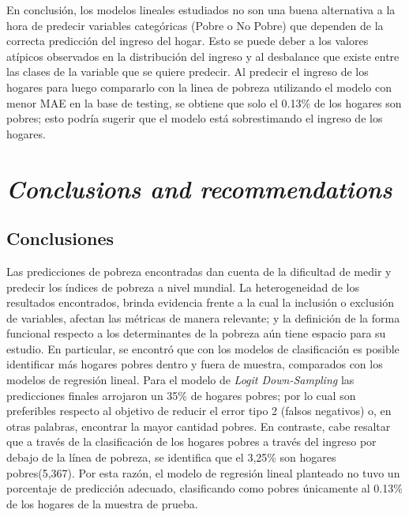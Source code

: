 \documentclass[11pt]{article}
\begin{document}
\justify
En conclusión, los modelos lineales estudiados no son una buena alternativa a la hora de predecir variables categóricas (Pobre o No Pobre) que dependen de la correcta predicción del ingreso del hogar. Esto se puede deber a los valores atípicos observados en la distribución del ingreso y al desbalance que existe entre las clases de la variable que se quiere predecir. Al predecir el ingreso de los hogares para luego compararlo con la linea de pobreza utilizando el modelo con menor MAE en la base de testing, se obtiene que solo el 0.13\% de los hogares son pobres; esto podría sugerir que el modelo está sobrestimando el ingreso de los hogares.

\section{\bf\emph {Conclusions and recommendations}}
\subsection{Conclusiones}
  \justify
Las predicciones de pobreza encontradas dan cuenta de la dificultad de medir y predecir los índices de pobreza a nivel mundial. La heterogeneidad de los resultados encontrados, brinda evidencia frente a la cual la inclusión o exclusión de variables, afectan las métricas de manera relevante; y la definición de la forma funcional respecto a los determinantes de la pobreza aún tiene espacio para su estudio. 
\justify
En particular, se encontró que con los modelos de clasificación es posible identificar más hogares pobres dentro y fuera de muestra, comparados con los modelos de regresión lineal. Para el modelo de \emph {Logit Down-Sampling} las predicciones finales arrojaron un 35\% de hogares pobres; por lo cual son preferibles respecto al objetivo de reducir el error tipo 2 (falsos negativos) o, en otras palabras, encontrar la mayor cantidad pobres. En contraste, cabe resaltar que a través de la clasificación de los hogares pobres a través del ingreso por debajo de la línea de pobreza, se identifica que el 3,25\% son hogares pobres(5,367). Por esta razón, el modelo de regresión lineal planteado no tuvo un porcentaje de predicción adecuado,
clasificando como pobres únicamente al 0.13\% de los hogares de la muestra de prueba. 
\end{document}
